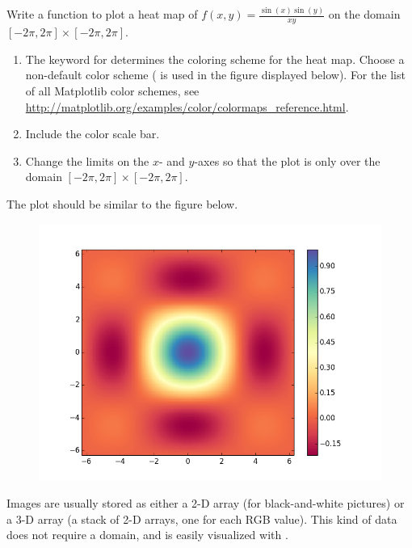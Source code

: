 \begin{problem} %
\label{prob:heatmap}
Write a function to plot a heat map of $f(x,y) = \frac{\sin(x)\sin(y)}{xy}$ on the domain $[-2\pi,2\pi] \times [-2\pi,2\pi]$.

\begin{enumerate}
\item The keyword  for  determines the coloring scheme for the heat map.
Choose a non-default color scheme ( is used in the figure displayed below).
For the list of all Matplotlib color schemes, see\\\url{http://matplotlib.org/examples/color/colormaps_reference.html}.
\item Include the color scale bar.
\item Change the limits on the $x$- and $y$-axes so that the plot is only over the domain $[-2\pi,2\pi] \times [-2\pi,2\pi]$.
\end{enumerate}
The plot should be similar to the figure below.

\begin{figure}[H]
\includegraphics[width=.7\textwidth]{pcolor2.png}
\end{figure}
\end{problem}

\begin{info} %
Images are usually stored as either a 2-D array (for black-and-white pictures) or a 3-D array (a stack of 2-D arrays, one for each RGB value).
This kind of data does not require a domain, and is easily visualized with .
\end{info}

